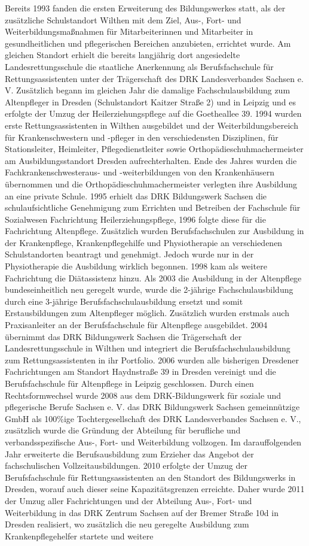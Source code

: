 Bereits 1993 fanden die ersten Erweiterung des Bildungswerkes statt, als der zusätzliche Schulstandort Wilthen mit dem Ziel, Aus-, Fort- und Weiterbildungsmaßnahmen für Mitarbeiterinnen und Mitarbeiter in gesundheitlichen und pflegerischen Bereichen anzubieten, errichtet wurde. Am gleichen Standort erhielt die bereits langjährig dort angesiedelte Landesrettungsschule die staatliche Anerkennung als Berufsfachschule für Rettungsassistenten unter der Trägerschaft des DRK Landesverbandes Sachsen e. V. Zusätzlich  begann im gleichen Jahr die damalige Fachschulausbildung zum Altenpfleger in Dresden (Schulstandort Kaitzer Straße 2) und in Leipzig und es erfolgte der Umzug der Heilerziehungspflege auf die Goetheallee 39. 1994 wurden erste Rettungsassistenten in Wilthen ausgebildet und der Weiterbildungsbereich für Krankenschwestern und -pfleger in den verschiedensten Disziplinen, für Stationsleiter, Heimleiter, Pflegedienstleiter sowie Orthopädieschuhmachermeister am Ausbildungsstandort Dresden aufrechterhalten. Ende des Jahres wurden die Fachkrankenschwesteraus- und -weiterbildungen von den Krankenhäusern übernommen und die Orthopädieschuhmachermeister verlegten ihre Ausbildung an eine private Schule. 1995 erhielt das DRK Bildungswerk Sachsen die schulaufsichtliche Genehmigung zum Errichten und Betreiben der Fachschule für Sozialwesen Fachrichtung Heilerziehungspflege, 1996 folgte diese für die Fachrichtung Altenpflege. Zusätzlich wurden Berufsfachschulen zur Ausbildung in der Krankenpflege, Krankenpflegehilfe und Physiotherapie an verschiedenen Schulstandorten beantragt und genehmigt. Jedoch wurde nur in der Physiotherapie die Ausbildung wirklich begonnen. 1998 kam als weitere Fachrichtung die Diätassistenz hinzu. Als 2003 die Ausbildung in der Altenpflege bundeseinheitlich neu geregelt wurde, wurde die 2-jährige Fachschulausbildung durch eine 3-jährige Berufsfachschulausbildung ersetzt und somit Erstausbildungen zum Altenpfleger möglich. Zusätzlich wurden erstmals auch Praxisanleiter an der Berufsfachschule für Altenpflege ausgebildet. 2004 übernimmt das DRK Bildungswerk Sachsen die Trägerschaft der Landesrettungsschule in Wilthen und integriert die Berufsfachschulausbildung zum Rettungsassistenten in ihr Portfolio. 2006 wurden alle bisherigen Dresdener Fachrichtungen am Standort Haydnstraße 39 in Dresden vereinigt und die Berufsfachschule für Altenpflege in Leipzig geschlossen. Durch einen Rechtsformwechsel wurde 2008 aus dem DRK-Bildungswerk für soziale und pflegerische Berufe Sachsen e. V. das DRK Bildungswerk Sachsen gemeinnützige GmbH als 100\%ige Tochtergesellschaft des DRK Landesverbandes Sachsen e. V., zusätzlich wurde die Gründung der Abteilung für berufliche und verbandsspezifische Aus-, Fort- und Weiterbildung vollzogen. Im darauffolgenden Jahr erweiterte die Berufsausbildung zum Erzieher das Angebot der fachschulischen Vollzeitausbildungen. 2010 erfolgte der Umzug der Berufsfachschule für Rettungsassistenten an den Standort des Bildungswerks in Dresden, worauf auch dieser seine Kapazitätsgrenzen erreichte. Daher wurde 2011 der Umzug aller Fachrichtungen und der Abteilung Aus-, Fort- und Weiterbildung in das DRK Zentrum Sachsen auf der Bremer Straße 10d in Dresden realisiert, wo zusätzlich die neu geregelte Ausbildung zum Krankenpflegehelfer startete und weitere 